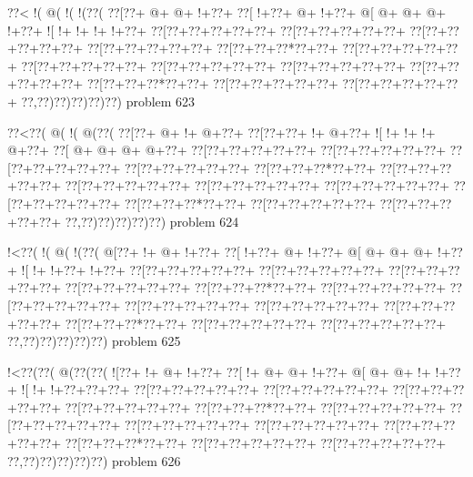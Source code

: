 \vbox{\vbox{\goo
\0??<\- !(\- @(\- !(\- !(\0??(
\0??[\0??+\- @+\- @+\- !+\0??+
\0??[\- !+\0??+\- @+\- !+\0??+
\- @[\- @+\- @+\- @+\- !+\0??+
\- ![\- !+\- !+\- !+\- !+\0??+
\0??[\0??+\0??+\0??+\0??+\0??+
\0??[\0??+\0??+\0??+\0??+\0??+
\0??[\0??+\0??+\0??+\0??+\0??+
\0??[\0??+\0??+\0??+\0??+\0??+
\0??[\0??+\0??+\0??*\0??+\0??+
\0??[\0??+\0??+\0??+\0??+\0??+
\0??[\0??+\0??+\0??+\0??+\0??+
\0??[\0??+\0??+\0??+\0??+\0??+
\0??[\0??+\0??+\0??+\0??+\0??+
\0??[\0??+\0??+\0??+\0??+\0??+
\0??[\0??+\0??+\0??*\0??+\0??+
\0??[\0??+\0??+\0??+\0??+\0??+
\0??[\0??+\0??+\0??+\0??+\0??+
\0??,\0??)\0??)\0??)\0??)\0??)
}
\hfil problem 623\hfil\break
}

\vbox{\vbox{\goo
\0??<\0??(\- @(\- !(\- @(\0??(
\0??[\0??+\- @+\- !+\- @+\0??+
\0??[\0??+\0??+\- !+\- @+\0??+
\- ![\- !+\- !+\- !+\- @+\0??+
\0??[\- @+\- @+\- @+\- @+\0??+
\0??[\0??+\0??+\0??+\0??+\0??+
\0??[\0??+\0??+\0??+\0??+\0??+
\0??[\0??+\0??+\0??+\0??+\0??+
\0??[\0??+\0??+\0??+\0??+\0??+
\0??[\0??+\0??+\0??*\0??+\0??+
\0??[\0??+\0??+\0??+\0??+\0??+
\0??[\0??+\0??+\0??+\0??+\0??+
\0??[\0??+\0??+\0??+\0??+\0??+
\0??[\0??+\0??+\0??+\0??+\0??+
\0??[\0??+\0??+\0??+\0??+\0??+
\0??[\0??+\0??+\0??*\0??+\0??+
\0??[\0??+\0??+\0??+\0??+\0??+
\0??[\0??+\0??+\0??+\0??+\0??+
\0??,\0??)\0??)\0??)\0??)\0??)
}
\hfil problem 624\hfil\break
}

\vbox{\vbox{\goo
\- !<\0??(\- !(\- @(\- !(\0??(
\- @[\0??+\- !+\- @+\- !+\0??+
\0??[\- !+\0??+\- @+\- !+\0??+
\- @[\- @+\- @+\- @+\- !+\0??+
\- ![\- !+\- !+\0??+\- !+\0??+
\0??[\0??+\0??+\0??+\0??+\0??+
\0??[\0??+\0??+\0??+\0??+\0??+
\0??[\0??+\0??+\0??+\0??+\0??+
\0??[\0??+\0??+\0??+\0??+\0??+
\0??[\0??+\0??+\0??*\0??+\0??+
\0??[\0??+\0??+\0??+\0??+\0??+
\0??[\0??+\0??+\0??+\0??+\0??+
\0??[\0??+\0??+\0??+\0??+\0??+
\0??[\0??+\0??+\0??+\0??+\0??+
\0??[\0??+\0??+\0??+\0??+\0??+
\0??[\0??+\0??+\0??*\0??+\0??+
\0??[\0??+\0??+\0??+\0??+\0??+
\0??[\0??+\0??+\0??+\0??+\0??+
\0??,\0??)\0??)\0??)\0??)\0??)
}
\hfil problem 625\hfil\break
}

\vbox{\vbox{\goo
\- !<\0??(\0??(\- @(\0??(\0??(
\- ![\0??+\- !+\- @+\- !+\0??+
\0??[\- !+\- @+\- @+\- !+\0??+
\- @[\- @+\- @+\- !+\- !+\0??+
\- ![\- !+\- !+\0??+\0??+\0??+
\0??[\0??+\0??+\0??+\0??+\0??+
\0??[\0??+\0??+\0??+\0??+\0??+
\0??[\0??+\0??+\0??+\0??+\0??+
\0??[\0??+\0??+\0??+\0??+\0??+
\0??[\0??+\0??+\0??*\0??+\0??+
\0??[\0??+\0??+\0??+\0??+\0??+
\0??[\0??+\0??+\0??+\0??+\0??+
\0??[\0??+\0??+\0??+\0??+\0??+
\0??[\0??+\0??+\0??+\0??+\0??+
\0??[\0??+\0??+\0??+\0??+\0??+
\0??[\0??+\0??+\0??*\0??+\0??+
\0??[\0??+\0??+\0??+\0??+\0??+
\0??[\0??+\0??+\0??+\0??+\0??+
\0??,\0??)\0??)\0??)\0??)\0??)
}
\hfil problem 626\hfil\break
}

